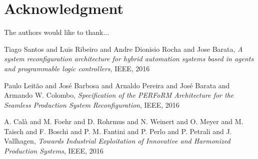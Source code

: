 \documentclass[conference,compsoc]{IEEEtran}
\begin{document}
  \section*{Acknowledgment}
\fi

The authors would like to thank...

\begin{thebibliography}{1}

Tiago Santos and Luis Ribeiro and Andre Dionisio Rocha and Jose Barata, \emph{A system reconfiguration architecture for hybrid
automation systems based in agents and
programmable logic controllers}, IEEE, 2016

Paulo Leitão and José Barbosa and Arnaldo Pereira and José Barata  and Armando W. Colombo, \emph{Specification of the PERFoRM Architecture for the Seamless Production System Reconfiguration}, IEEE, 2016

A. Calà and M. Foehr and D. Rohrmus and N. Weinert and O. Meyer and M. Taisch and F. Boschi and P. M. Fantini and P. Perlo and P. Petrali and J. Vallhagen, \emph{Towards Industrial Exploitation of Innovative and Harmonized Production Systems}, IEEE, 2016
\end{thebibliography}

\end{document}
